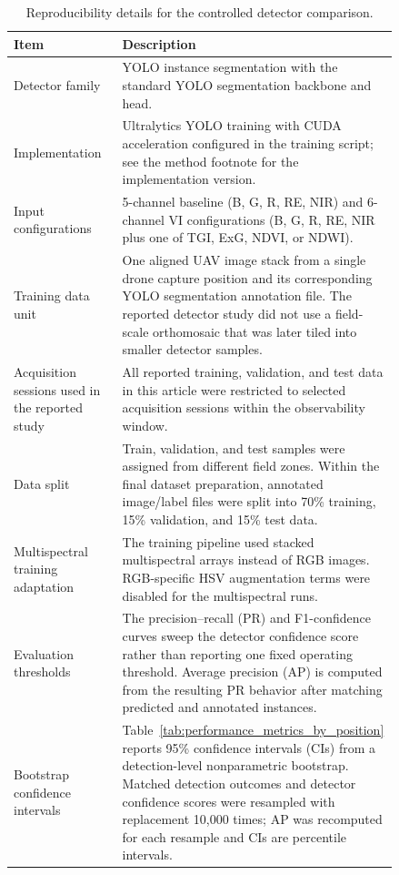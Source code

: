 \documentclass{ieeeaccess}
\begin{document}
\begin{table}[t]
\centering
\caption{Reproducibility details for the controlled detector comparison.}
\label{tab:reproducibility_details}
\scriptsize
\begin{tabular}{p{0.29\linewidth} p{0.55\linewidth}}
\toprule
\textbf{Item} & \textbf{Description} \\
\midrule
Detector family & YOLO instance segmentation with the standard YOLO segmentation backbone and head. \\
Implementation & Ultralytics YOLO training with CUDA acceleration configured in the training script; see the method footnote for the implementation version. \\
Input configurations & 5-channel baseline (B, G, R, RE, NIR) and 6-channel VI configurations (B, G, R, RE, NIR plus one of TGI, ExG, NDVI, or NDWI). \\
Training data unit & One aligned UAV image stack from a single drone capture position and its corresponding YOLO segmentation annotation file. The reported detector study did not use a field-scale orthomosaic that was later tiled into smaller detector samples. \\
Acquisition sessions used in the reported study & All reported training, validation, and test data in this article were restricted to selected acquisition sessions within the observability window. \\
Data split & Train, validation, and test samples were assigned from different field zones. Within the final dataset preparation, annotated image/label files were split into 70\% training, 15\% validation, and 15\% test data. \\
Multispectral training adaptation & The training pipeline used stacked multispectral arrays instead of RGB images. RGB-specific HSV augmentation terms were disabled for the multispectral runs. \\
	Evaluation thresholds & The precision--recall (PR) and F1-confidence curves sweep the detector confidence score rather than reporting one fixed operating threshold. Average precision (AP) is computed from the resulting PR behavior after matching predicted and annotated instances. \\
	Bootstrap confidence intervals & Table~\ref{tab:performance_metrics_by_position} reports 95\% confidence intervals (CIs) from a detection-level nonparametric bootstrap. Matched detection outcomes and detector confidence scores were resampled with replacement 10{,}000 times; AP was recomputed for each resample and CIs are percentile intervals. \\
\bottomrule
\end{tabular}
\end{table}
\end{document}
